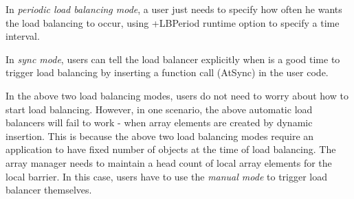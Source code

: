In {\em periodic load balancing mode}, a user just needs to specify how often
he wants the load balancing to occur, using +LBPeriod runtime option to specify
a time interval.

In {\em sync mode}, users can tell the load balancer explicitly when is a good
time to trigger load balancing by inserting a function call (AtSync) in the
user code.

In the above two load balancing modes, users do not need to worry about how to
start load balancing.  However, in one scenario, the above automatic load
balancers will fail to work - when array elements are created by dynamic insertion.
This is because the above two load balancing modes require an application to
have fixed number of objects at the time of load balancing.  The array manager
needs to maintain a head count of local array elements for the local barrier.
In this case, users have to use the {\em manual mode} to trigger load balancer
themselves.

